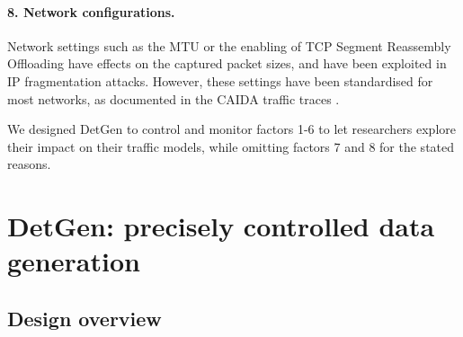 \paragraph{8. Network configurations.}
Network settings such as the MTU or the enabling of TCP Segment Reassembly Offloading have effects on the captured packet sizes, and have been exploited in IP fragmentation attacks. However, these settings have been standardised for most networks, as documented in the CAIDA traffic traces \cite{walsworth2015caida}.




\vspace{0.3cm}
We designed DetGen to control and monitor factors 1-6 to let researchers explore their impact on their traffic models, while omitting factors 7 and 8 for the stated reasons.

\section{DetGen: precisely controlled data generation}\label{Sec:Archi}





\subsection{Design overview}

